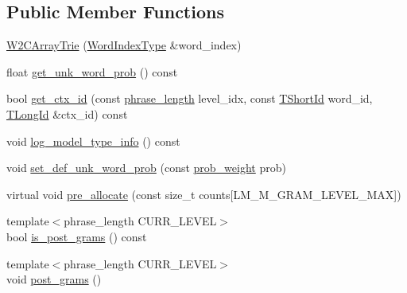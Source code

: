 \subsection*{Public Member Functions}
\begin{DoxyCompactItemize}
\item 
\hyperlink{classuva_1_1smt_1_1bpbd_1_1server_1_1lm_1_1_w2_c_array_trie_a557e68c9bfa125ad94c5e08d7862e845}{W2\+C\+Array\+Trie} (\hyperlink{classuva_1_1smt_1_1bpbd_1_1server_1_1lm_1_1_word_index_trie_base_a77ee32bf3a9f8a89558bda4f2031200c}{Word\+Index\+Type} \&word\+\_\+index)
\item 
float \hyperlink{classuva_1_1smt_1_1bpbd_1_1server_1_1lm_1_1_w2_c_array_trie_a51439b23a86fb103121294e56f71a478}{get\+\_\+unk\+\_\+word\+\_\+prob} () const 
\item 
bool \hyperlink{classuva_1_1smt_1_1bpbd_1_1server_1_1lm_1_1_w2_c_array_trie_a838db9e2f81c8a541a9b2657122a086f}{get\+\_\+ctx\+\_\+id} (const \hyperlink{namespaceuva_1_1smt_1_1bpbd_1_1server_af068a19c2e03116caf3e3827a3e40e35}{phrase\+\_\+length} level\+\_\+idx, const \hyperlink{namespaceuva_1_1smt_1_1bpbd_1_1server_1_1lm_1_1identifiers_a33043a191e9a637dea742a89d23c8bdc}{T\+Short\+Id} word\+\_\+id, \hyperlink{namespaceuva_1_1smt_1_1bpbd_1_1server_1_1lm_1_1identifiers_a6841847096e455ad3c38689bc548b3b0}{T\+Long\+Id} \&ctx\+\_\+id) const 
\item 
void \hyperlink{classuva_1_1smt_1_1bpbd_1_1server_1_1lm_1_1_w2_c_array_trie_a1d2a8af923b06492e435f1faa4f42705}{log\+\_\+model\+\_\+type\+\_\+info} () const 
\item 
void \hyperlink{classuva_1_1smt_1_1bpbd_1_1server_1_1lm_1_1_w2_c_array_trie_a3f4878185872813fdb31bc8d30108d47}{set\+\_\+def\+\_\+unk\+\_\+word\+\_\+prob} (const \hyperlink{namespaceuva_1_1smt_1_1bpbd_1_1server_a01e9ea4de9c226f4464862e84ff0bbcc}{prob\+\_\+weight} prob)
\item 
virtual void \hyperlink{classuva_1_1smt_1_1bpbd_1_1server_1_1lm_1_1_w2_c_array_trie_a7407bbbc32d72016f90602588d3e8259}{pre\+\_\+allocate} (const size\+\_\+t counts\mbox{[}L\+M\+\_\+\+M\+\_\+\+G\+R\+A\+M\+\_\+\+L\+E\+V\+E\+L\+\_\+\+M\+A\+X\mbox{]})
\item 
{\footnotesize template$<$phrase\+\_\+length C\+U\+R\+R\+\_\+\+L\+E\+V\+E\+L$>$ }\\bool \hyperlink{classuva_1_1smt_1_1bpbd_1_1server_1_1lm_1_1_w2_c_array_trie_adc38f41c45461b867c932a38fcf4b1b4}{is\+\_\+post\+\_\+grams} () const 
\item 
{\footnotesize template$<$phrase\+\_\+length C\+U\+R\+R\+\_\+\+L\+E\+V\+E\+L$>$ }\\void \hyperlink{classuva_1_1smt_1_1bpbd_1_1server_1_1lm_1_1_w2_c_array_trie_ab873e939e656e46f2cf372ce922cd0e0}{post\+\_\+grams} ()

\end{DoxyCompactItemize}
